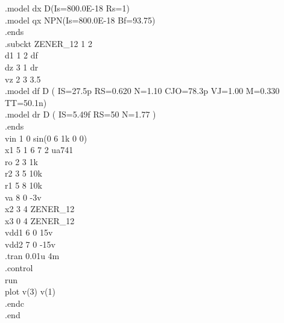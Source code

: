 \documentclass[12pt]{article}
\begin{document}
.model dx D(Is=800.0E-18 Rs=1)\\
.model qx NPN(Is=800.0E-18 Bf=93.75)\\
.ends\\
\newpage
.subckt ZENER\_12 1 2\\
d1 1 2 df\\
dz 3 1 dr\\
vz 2 3 3.5\\
.model df D ( IS=27.5p RS=0.620 N=1.10 CJO=78.3p VJ=1.00 M=0.330 TT=50.1n)\\
.model dr D ( IS=5.49f RS=50 N=1.77 )\\
.ends\\
vin 1 0 sin(0 6 1k 0 0)\\
x1 5 1 6 7 2 ua741\\
ro 2 3 1k\\
r2 3 5 10k\\
r1 5 8 10k\\
va 8 0 -3v\\
x2 3 4 ZENER\_12\\
x3 0 4 ZENER\_12\\
vdd1 6 0 15v\\
vdd2 7 0 -15v\\
.tran 0.01u 4m\\
.control\\
run \\
plot v(3) v(1)\\
.endc\\
.end\\
\newpage
\end{document}
